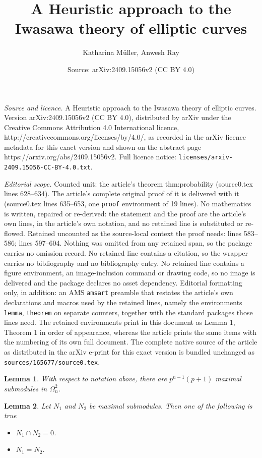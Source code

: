 \documentclass[10pt,a4paper]{amsart}
\title{A Heuristic approach to the Iwasawa theory of elliptic curves}
\author{Katharina M\"uller, Anwesh Ray}
\date{Source: arXiv:2409.15056v2 (CC BY 4.0)}
\newtheorem{lemma}{Lemma}
\begin{document}
\maketitle

\noindent\emph{Source and licence.} A Heuristic approach to the Iwasawa theory of elliptic curves. Version arXiv:2409.15056v2 (CC BY 4.0), distributed by arXiv under the Creative Commons Attribution 4.0 International licence, http://creativecommons.org/licenses/by/4.0/, as recorded in the arXiv licence metadata for this exact version and shown on the abstract page https://arxiv.org/abs/2409.15056v2. Full licence notice: \texttt{licenses/arxiv-2409.15056-CC-BY-4.0.txt}.\par\smallskip

\noindent\textit{Editorial scope.} Counted unit: the article's theorem thm:probability (source0.tex lines 628--634). The article's complete original proof of it is delivered with it (source0.tex lines 635--653, one \texttt{proof} environment of 19 lines). No mathematics is written, repaired or re-derived: the statement and the proof are the article's own lines, in the article's own notation, and no retained line is substituted or re-flowed.  Retained uncounted as the source-local context the proof needs: lines 583--586; lines 597--604.  Nothing was omitted from any retained span, so the package carries no omission record.  No retained line contains a citation, so the wrapper carries no bibliography and no bibliography entry.  No retained line contains a figure environment, an image-inclusion command or drawing code, so no image is delivered and the package declares no asset dependency.  Editorial formatting only, in addition: an AMS \texttt{amsart} preamble that restates the article's own declarations and macros used by the retained lines, namely the environments \texttt{lemma}, \texttt{theorem} on separate counters, together with the standard packages those lines need.  The retained environments print in this document as Lemma 1, Theorem 1 in order of appearance, whereas the article prints the same items with the numbering of its own full document.  The complete native source of the article as distributed in the arXiv e-print for this exact version is bundled unchanged as \texttt{sources/165677/source0.tex}.
\begin{lemma}
\label{number of maximal submodules}
    With respect to notation above, there are $p^{n-1}(p+1)$ maximal submodules in $\Omega_n^2$.
\end{lemma}

\begin{lemma}
    \label{max-cyclic}
    Let $N_1$ and $N_2$ be maximal submodules. Then one of the following is true
    \begin{itemize}
        \item $N_1\cap N_2=0$.
        \item $N_1=N_2$.
    \end{itemize}
\end{lemma}
\end{document}
